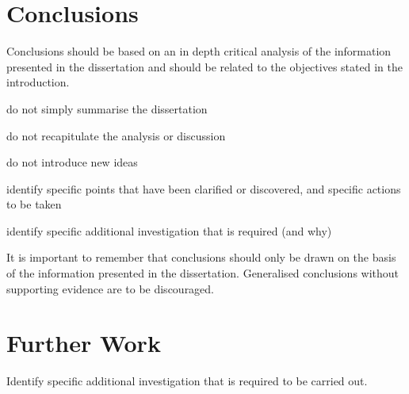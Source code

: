 \section{Conclusions}
Conclusions should be based on an in depth critical analysis of the information presented in the
dissertation and should be related to the objectives stated in the introduction.

\newpage
do not simply summarise the dissertation

do not recapitulate the analysis or discussion

do not introduce new ideas

identify specific points that have been clarified or discovered, and specific
actions to be taken

identify specific additional investigation that is required (and why)

\newpage
It is important to remember that conclusions should only be drawn on the basis of the information
presented in the dissertation. Generalised conclusions without supporting evidence are to be
discouraged.
\newpage

\section{Further Work}
Identify specific additional investigation that is required to be carried out.

\newpage
